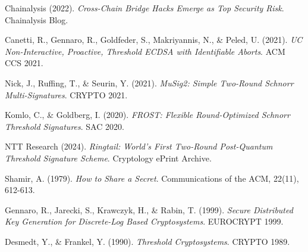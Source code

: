 \documentclass[11pt]{article}
\begin{document}
\begin{thebibliography}{99}

Chainalysis (2022).
\textit{Cross-Chain Bridge Hacks Emerge as Top Security Risk}.
Chainalysis Blog.

Canetti, R., Gennaro, R., Goldfeder, S., Makriyannis, N., \& Peled, U. (2021).
\textit{UC Non-Interactive, Proactive, Threshold ECDSA with Identifiable Aborts}.
ACM CCS 2021.

Nick, J., Ruffing, T., \& Seurin, Y. (2021).
\textit{MuSig2: Simple Two-Round Schnorr Multi-Signatures}.
CRYPTO 2021.

Komlo, C., \& Goldberg, I. (2020).
\textit{FROST: Flexible Round-Optimized Schnorr Threshold Signatures}.
SAC 2020.

NTT Research (2024).
\textit{Ringtail: World's First Two-Round Post-Quantum Threshold Signature Scheme}.
Cryptology ePrint Archive.

Shamir, A. (1979).
\textit{How to Share a Secret}.
Communications of the ACM, 22(11), 612-613.

Gennaro, R., Jarecki, S., Krawczyk, H., \& Rabin, T. (1999).
\textit{Secure Distributed Key Generation for Discrete-Log Based Cryptosystems}.
EUROCRYPT 1999.

Desmedt, Y., \& Frankel, Y. (1990).
\textit{Threshold Cryptosystems}.
CRYPTO 1989.

\end{thebibliography}
\end{document}

